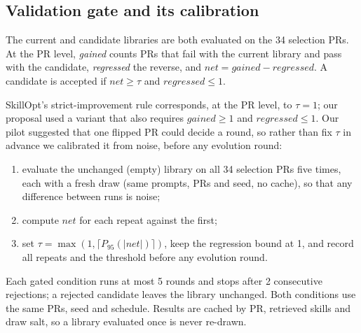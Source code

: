 \documentclass[sigconf, authorversion, nonacm]{acmart}
\begin{document}
\subsection{Validation gate and its calibration}
The current and candidate libraries are both evaluated on the 34 selection PRs. At the PR level, \emph{gained} counts PRs that fail with the current library and pass with the candidate, \emph{regressed} the reverse, and $\mathit{net} = \mathit{gained} - \mathit{regressed}$. A candidate is accepted if $\mathit{net} \geq \tau$ and $\mathit{regressed} \leq 1$.

SkillOpt's strict-improvement rule corresponds, at the PR level, to $\tau = 1$; our proposal used a variant that also requires $\mathit{gained} \geq 1$ and $\mathit{regressed} \leq 1$. Our pilot suggested that one flipped PR could decide a round, so rather than fix $\tau$ in advance we calibrated it from noise, before any evolution round:
\begin{enumerate}
\item evaluate the unchanged (empty) library on all 34 selection PRs five times, each with a fresh draw (same prompts, PRs and seed, no cache), so that any difference between runs is noise;
\item compute $\mathit{net}$ for each repeat against the first;
\item set $\tau = \max(1, \lceil P_{95}(|\mathit{net}|)\rceil)$, keep the regression bound at 1, and record all repeats and the threshold before any evolution round.
\end{enumerate}

Each gated condition runs at most 5 rounds and stops after 2 consecutive rejections; a rejected candidate leaves the library unchanged. Both conditions use the same PRs, seed and schedule. Results are cached by PR, retrieved skills and draw salt, so a library evaluated once is never re-drawn.
\end{document}

